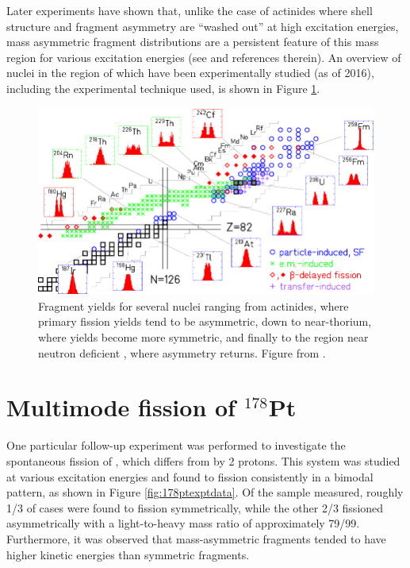 Later experiments have shown that, unlike the case of actinides where shell structure and fragment asymmetry are ``washed out'' at high excitation energies, mass asymmetric fragment distributions are a persistent feature of this mass region for various excitation energies (see \cite{Andreyev2018} and references therein). An overview of nuclei in the region of {\Hg} which have been experimentally studied (as of 2016), including the experimental technique used, is shown in Figure \ref{fig:178ptregion}.

\begin{figure}
	\centering
	\includegraphics[width=0.9\linewidth]{./TeX_files/178Pt_region}
	\caption[Survey of fragment yields near $^{180}$Hg]{Fragment yields for several nuclei ranging from actinides, where primary fission yields tend to be asymmetric, down to near-thorium, where yields become more symmetric, and finally to the region near neutron deficient {\Hg}, where asymmetry returns. Figure from \cite{Andreyev2018}.}
	\label{fig:178ptregion}
\end{figure}



\section{Multimode fission of $^{178}$Pt}

One particular follow-up experiment was performed to investigate the spontaneous fission of {\Pt} \cite{Tsekhanovich2019}, which differs from {\Hg} by 2 protons. This system was studied at various excitation energies and found to fission consistently in a bimodal pattern, as shown in Figure \ref{fig:178ptexptdata}. Of the sample measured, roughly 1/3 of cases were found to fission symmetrically, while the other 2/3 fissioned asymmetrically with a light-to-heavy mass ratio of approximately 79/99. Furthermore, it was observed that mass-asymmetric fragments tended to have higher kinetic energies than symmetric fragments.

